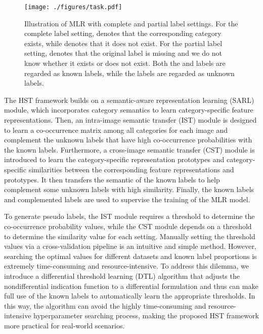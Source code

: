 \begin{figure}[!t]
   \centering
   \texttt{[image: ./figures/task.pdf]}
   \caption{Illustration of MLR with complete and partial label settings. For the complete label setting,  denotes that the corresponding category exists, while  denotes that it does not exist. For the partial label setting,  denotes that the original label is missing and we do not know whether it exists or does not exist. Both the  and  labels are regarded as known labels, while the  labels are regarded as unknown labels.}
   \label{fig:task}
\end{figure}

The HST framework builds on a semantic-aware representation learning (SARL) module, which incorporates category semantics to learn category-specific feature representations. Then, an intra-image semantic transfer (IST) module is designed to learn a co-occurrence matrix among all categories for each image and complement the unknown labels that have high co-occurrence probabilities with the known labels. Furthermore, a cross-image semantic transfer (CST) module is introduced to learn the category-specific representation prototypes and category-specific similarities between the corresponding feature representations and prototypes. It then transfers the semantic of the known labels to help complement some unknown labels with high similarity. Finally, the known labels and complemented labels are used to supervise the training of the MLR model.

To generate pseudo labels, the IST module requires a threshold to determine the co-occurrence probability values, while the CST module depends on a threshold to determine the similarity value for each setting. Manually setting the threshold values via a cross-validation pipeline is an intuitive and simple method. However, searching the optimal values for different datasets and known label proportions is extremely time-consuming and resource-intensive. To address this dilemma, we introduce a differential threshold learning (DTL) algorithm that adjusts the nondifferential indication function to a differential formulation and thus can make full use of the known labels to automatically learn the appropriate thresholds. In this way, the algorithm can avoid the highly time-consuming and resource-intensive hyperparameter searching process, making the proposed HST framework more practical for real-world scenarios.

